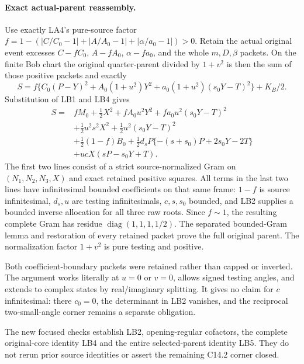 \paragraph{Exact actual-parent reassembly.}
Use exactly LA4's pure-source factor
$f=1-(|C/C_0-1|+|A/A_0-1|+|\alpha/a_0-1|)>0$.
Retain the actual original event excesses
$C-fC_0$, $A-fA_0$, $\alpha-fa_0$, and the whole $m,D,\beta$
packets.  On the finite Bob chart the original quarter-parent divided
by $1+v^2$ is then the sum of those positive packets and exactly
\[
 S=f\{C_0(P-Y)^2+A_0(1+u^2)Y^2
                         +a_0(1+u^2)(s_0Y-T)^2\}+K_B/2.
\]
Substitution of LB1 and LB4 gives
\[
\begin{split}
 S={}&fM_0+\tfrac12X^2
       +fA_0u^2Y^2+fa_0u^2(s_0Y-T)^2\\
    &+\tfrac12u^2s^2X^2+\tfrac12u^2(s_0Y-T)^2\\
    &+\tfrac12(1-f)B_0
       +\tfrac12d_sP\{-(s+s_0)P+2s_0Y-2T\}\\
    &+ucX(sP-s_0Y+T).
\end{split} \tag{LB5}
\]
The first two lines consist of a strict source-normalized Gram on
$(N_1,N_2,N_3,X)$ and exact retained positive squares.  All terms
in the last two lines have infinitesimal bounded coefficients on
that same frame: $1-f$ is source infinitesimal, $d_s,u$ are testing
infinitesimals, $c,s,s_0$ bounded, and LB2 supplies a bounded inverse
allocation for all three raw roots.  Since $f\sim1$, the resulting
complete Gram has residue $\operatorname{diag}(1,1,1,1/2)$.
The separated bounded-Gram lemma and restoration of every retained
packet prove the full original parent.  The normalization factor
$1+v^2$ is pure testing and positive.

Both coefficient-boundary packets were retained rather than capped
or inverted.  The argument works literally at $u=0$ or $v=0$,
allows signed testing angles, and extends to complex states by
real/imaginary splitting.  It gives no claim for $c$ infinitesimal:
there $c_0=0$, the determinant in LB2 vanishes, and the reciprocal
two-small-angle corner remains a separate obligation.

The new focused checks establish LB2, opening-regular cofactors,
the complete original-core identity LB4 and the entire selected-parent
identity LB5.  They do not rerun prior source identities or assert
the remaining C14.2 corner closed.
